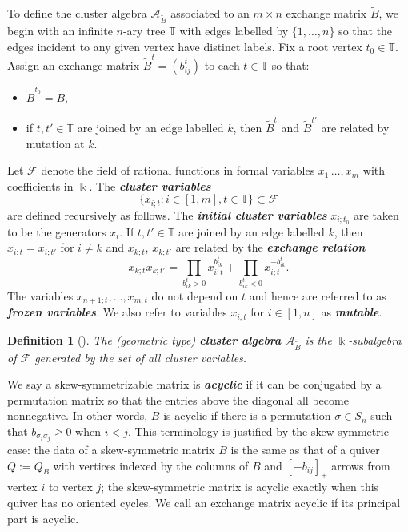 \documentclass[12pt]{amsart}
\newcommand{\newword}[1]{\textbf{\emph{#1}}}
\newcommand{\cA}{\mathcal{A}}
\newcommand{\TT}{\mathbb{T}}
\newcommand{\kk}{\Bbbk}
\newcommand{\cF}{\mathcal{F}}
\newtheorem{definition}[theorem]{Definition}
\theoremstyle{remark}
\numberwithin{equation}{section}
\numberwithin{figure}{section}
\begin{document}
To define the cluster algebra $\cA_{\widetilde B}$ associated to an $m \times n$ exchange matrix $\widetilde B$, we begin with an infinite $n$-ary tree $\TT$ with edges labelled by $\{1,\dotsc,n\}$ so that the edges incident to any given vertex have distinct labels.
Fix a root vertex $t_0 \in\TT$.
Assign an exchange matrix $\widetilde B^t=(b_{ij}^t)$ to each $t \in\TT$ so that:
\begin{itemize}
  \item $\widetilde B^{t_0} = \widetilde B$,
  \item if $t, t' \in\TT$ are joined by an edge labelled $k$, then $\widetilde B^t$ and $\widetilde B^{t'}$ are related by mutation at $k$.
\end{itemize}

Let $\cF$ denote the field of rational functions in formal variables $x_{1}\,\dotsc,x_{m}$ with coefficients in $\kk$.
The \newword{cluster variables}
\[
  \big\{ x_{i;t}: i \in [1,m], t \in\TT\big\} \subset \cF
\]
are defined recursively as follows.
The \newword{initial cluster variables} $x_{i;t_0}$ are taken to be the generators $x_i$.
If $t,t' \in \TT$ are joined by an edge labelled $k$, then $x_{i;t} = x_{i;t'}$ for $i \neq k$ and $x_{k;t}$, $x_{k;t'}$ are related by the \newword{exchange relation} 
\[
  x_{k;t}x_{k;t'} 
  = 
  \prod_{b^t_{ik}>0}x_{i;t}^{b^t_{ik}} 
  + 
  \prod_{b^t_{ik}<0}x_{i;t}^{-b^t_{ik}}.
\]
The variables $x_{n+1;t},\dotsc, x_{m;t}$ do not depend on $t$ and hence are referred to as \newword{frozen variables}.
We also refer to variables $x_{i;t}$ for $i\in[1,n]$ as \newword{mutable}.

\begin{definition}[\cite{FZ02}]
  The (geometric type) \newword{cluster algebra} $\cA_{\widetilde B}$ is the $\kk$-subalgebra of $\cF$ generated by the set of all cluster variables.
\end{definition}

We say a skew-symmetrizable matrix is \newword{acyclic} if it can be conjugated by a permutation matrix so that the entries above the diagonal all become nonnegative.
In other words, $B$ is acyclic if there is a permutation $\sigma \in S_n$ such that $b_{\sigma_i \sigma_j} \geq 0$ when $i < j$. 
This terminology is justified by the skew-symmetric case: the data of a skew-symmetric matrix $B$ is the same as that of a quiver $Q := Q_B$ with vertices indexed by the columns of $B$ and $[-b_{ij}]_+$ arrows from vertex $i$ to vertex $j$; the skew-symmetric matrix is acyclic exactly when this quiver has no oriented cycles.
We call an exchange matrix acyclic if its principal part is acyclic.
\end{document}
